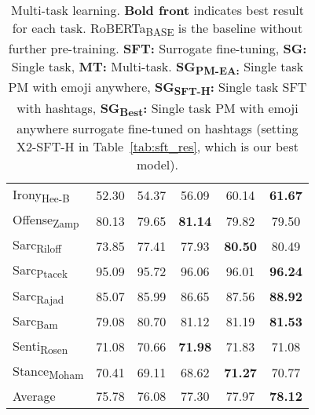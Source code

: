 \begin{table}[]
\begin{tabular}{@{}lcc:ccc@{}}
Irony\textsubscript{Hee-B}        & 52.30                           & 54.37                           & 56.09                                  & 60.14                                  & \textbf{61.67}                        \\
Offense\textsubscript{Zamp}       & 80.13                           & 79.65                           & \textbf{81.14}                         & 79.82                                  & 79.50                                 \\
Sarc\textsubscript{Riloff}        & 73.85                           & 77.41                           & 77.93                                  & \textbf{80.50}                         & 80.49                                 \\
Sarc\textsubscript{Ptacek}        & 95.09                           & 95.72                           & 96.06                                  & 96.01                                  & \textbf{96.24}                        \\
Sarc\textsubscript{Rajad}         & 85.07                           & 85.99                           & 86.65                                  & 87.56                                  & \textbf{88.92}                        \\
Sarc\textsubscript{Bam}           & 79.08                           & 80.70                           & 81.12                                  & 81.19                                  & \textbf{81.53}                        \\
Senti\textsubscript{Rosen}        & 71.08                           & 70.66                           & \textbf{71.98}                         & 71.83                                  & 71.08                                 \\
Stance\textsubscript{Moham}       & 70.41                           & 69.11                           & 68.62                                  & \textbf{71.27}                         & 70.77                                 \\ 
Average                                            & 75.78                           & 76.08                           & 77.30                                  & 77.97                                  & \textbf{78.12}                        \\ \bottomrule
\end{tabular}


\caption{Multi-task learning. \textbf{Bold front} indicates best result for each task. RoBERTa\textsubscript{BASE} is the baseline without further pre-training. \textbf{SFT:} Surrogate fine-tuning, \textbf{SG:} Single task, \textbf{MT:} Multi-task. \textbf{SG\textsubscript{PM-EA:}} Single task PM with emoji anywhere, \textbf{SG\textsubscript{SFT-H}:} Single task SFT with hashtags, \textbf{SG\textsubscript{Best}:} Single task PM with emoji anywhere surrogate fine-tuned on hashtags (setting X2-SFT-H in Table~\ref{tab:sft_res}, which is our best model).}\label{tab:mtl_res}
\end{table}


